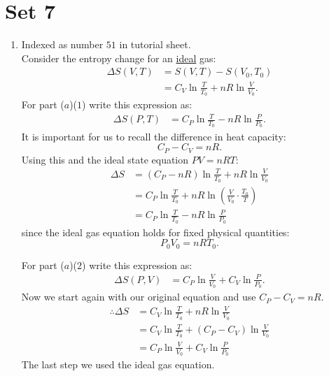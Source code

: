 \pagestyle{fancy}
\fancyhead{}

\section{Set 7}
\begin{enumerate}
    \item Indexed as number $51$ in tutorial sheet. \\
    
    Consider the entropy change for an \underline{ideal} gas:
    \begin{align*}
        \Delta S(V,T)
        &=S(V,T)-S(V_0,T_0) \\
        &=C_V\ln\frac{T}{T_0}+nR\ln\frac{V}{V_0}.
    \end{align*}
    For part ($a$)($1$) write this expression as:
    \begin{align*}
        \Delta S(P,T)
        &=C_P\ln\frac{T}{T_0}-nR\ln\frac{P}{P_0}.
    \end{align*}
    It is important for us to recall the difference in heat capacity:
    $$C_P-C_V=nR.$$
    Using this and the ideal state equation $PV=nRT$:
    \begin{align*}
        \Delta S
        &=(C_P-nR)\ln\frac{T}{T_0}+nR\ln\frac{V}{V_0} \\
        &=C_P\ln\frac{T}{T_0}+nR\ln\left(
            \frac{V}{V_0}\cdot\frac{T_0}{T}
        \right) \\
        &=C_P\ln\frac{T}{T_0}-nR\ln\frac{P}{P_0}
    \end{align*}
    since the ideal gas equation holds for fixed physical quantities:
    $$P_0 V_0=nRT_0.$$

    For part ($a$)($2$) write this expression as:
    \begin{align*}
        \Delta S(P,V)
        &=C_P\ln\frac{V}{V_0}+C_V\ln\frac{P}{P_0}.
    \end{align*}
    Now we start again with our original equation and
    use $C_P-C_V=nR$.
    \begin{align*}
        \therefore\Delta S
        &=C_V\ln\frac{T}{T_0}+nR\ln\frac{V}{V_0} \\
        &=C_V\ln\frac{T}{T_0}+(C_P-C_V)\ln\frac{V}{V_0} \\
        &=C_P\ln\frac{V}{V_0}+C_V\ln\frac{P}{P_0}
    \end{align*}
    The last step we used the ideal gas equation.


\end{enumerate}
